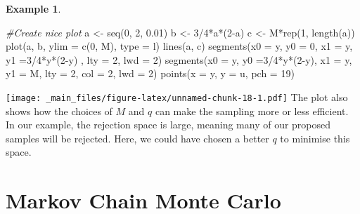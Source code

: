 \documentclass[
]{book}
\newenvironment{Shaded}{\begin{snugshade}}{\end{snugshade}}
\newcommand{\AttributeTok}[1]{\textcolor[rgb]{0.77,0.63,0.00}{#1}}
\newcommand{\CommentTok}[1]{\textcolor[rgb]{0.56,0.35,0.01}{\textit{#1}}}
\newcommand{\DecValTok}[1]{\textcolor[rgb]{0.00,0.00,0.81}{#1}}
\newcommand{\FloatTok}[1]{\textcolor[rgb]{0.00,0.00,0.81}{#1}}
\newcommand{\FunctionTok}[1]{\textcolor[rgb]{0.00,0.00,0.00}{#1}}
\newcommand{\NormalTok}[1]{#1}
\newcommand{\OtherTok}[1]{\textcolor[rgb]{0.56,0.35,0.01}{#1}}
\newcommand{\SpecialCharTok}[1]{\textcolor[rgb]{0.00,0.00,0.00}{#1}}
\newcommand{\StringTok}[1]{\textcolor[rgb]{0.31,0.60,0.02}{#1}}
\theoremstyle{definition}
\theoremstyle{definition}
\newtheorem{example}{Example}[chapter]
\theoremstyle{definition}
\theoremstyle{definition}
\theoremstyle{remark}
\begin{document}
\begin{example}
\begin{Shaded}
\begin{Highlighting}[]
\CommentTok{\#Create nice plot}
\NormalTok{a }\OtherTok{\textless{}{-}} \FunctionTok{seq}\NormalTok{(}\DecValTok{0}\NormalTok{, }\DecValTok{2}\NormalTok{, }\FloatTok{0.01}\NormalTok{)}
\NormalTok{b }\OtherTok{\textless{}{-}} \DecValTok{3}\SpecialCharTok{/}\DecValTok{4}\SpecialCharTok{*}\NormalTok{a}\SpecialCharTok{*}\NormalTok{(}\DecValTok{2}\SpecialCharTok{{-}}\NormalTok{a)}
\NormalTok{c }\OtherTok{\textless{}{-}}\NormalTok{ M}\SpecialCharTok{*}\FunctionTok{rep}\NormalTok{(}\DecValTok{1}\NormalTok{, }\FunctionTok{length}\NormalTok{(a))}
\FunctionTok{plot}\NormalTok{(a, b, }\AttributeTok{ylim =} \FunctionTok{c}\NormalTok{(}\DecValTok{0}\NormalTok{, M), }\AttributeTok{type =} \StringTok{\textquotesingle{}l\textquotesingle{}}\NormalTok{)}
\FunctionTok{lines}\NormalTok{(a, c)}
\FunctionTok{segments}\NormalTok{(}\AttributeTok{x0 =}\NormalTok{ y, }\AttributeTok{y0 =} \DecValTok{0}\NormalTok{, }\AttributeTok{x1 =}\NormalTok{ y,  }\AttributeTok{y1 =}\DecValTok{3}\SpecialCharTok{/}\DecValTok{4}\SpecialCharTok{*}\NormalTok{y}\SpecialCharTok{*}\NormalTok{(}\DecValTok{2}\SpecialCharTok{{-}}\NormalTok{y) , }\AttributeTok{lty =} \DecValTok{2}\NormalTok{, }\AttributeTok{lwd =} \DecValTok{2}\NormalTok{)}
\FunctionTok{segments}\NormalTok{(}\AttributeTok{x0 =}\NormalTok{ y,  }\AttributeTok{y0 =}\DecValTok{3}\SpecialCharTok{/}\DecValTok{4}\SpecialCharTok{*}\NormalTok{y}\SpecialCharTok{*}\NormalTok{(}\DecValTok{2}\SpecialCharTok{{-}}\NormalTok{y), }\AttributeTok{x1 =}\NormalTok{ y, }\AttributeTok{y1 =}\NormalTok{ M, }\AttributeTok{lty =} \DecValTok{2}\NormalTok{, }\AttributeTok{col =} \DecValTok{2}\NormalTok{, }\AttributeTok{lwd =} \DecValTok{2}\NormalTok{)}
\FunctionTok{points}\NormalTok{(}\AttributeTok{x =}\NormalTok{ y, }\AttributeTok{y =}\NormalTok{ u, }\AttributeTok{pch =} \DecValTok{19}\NormalTok{)}
\end{Highlighting}
\end{Shaded}

\texttt{[image: \_main\_files/figure-latex/unnamed-chunk-18-1.pdf]}
The plot also shows how the choices of \(M\) and \(q\) can make the sampling more or less efficient. In our example, the rejection space is large, meaning many of our proposed samples will be rejected. Here, we could have chosen a better \(q\) to minimise this space.
\end{example}

\hypertarget{markov-chain-monte-carlo}{%
\section{Markov Chain Monte Carlo}\label{markov-chain-monte-carlo}}
\end{document}
